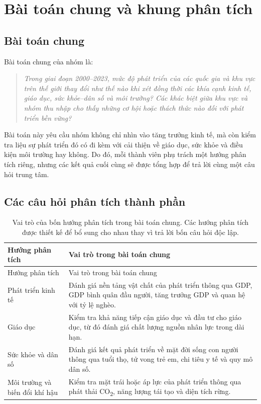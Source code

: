 \section{Bài toán chung và khung phân tích}

\subsection{Bài toán chung}

Bài toán chung của nhóm là:

\begin{quote}
\textit{Trong giai đoạn 2000--2023, mức độ phát triển của các quốc gia và khu vực trên thế giới thay đổi như thế nào khi xét đồng thời các khía cạnh kinh tế, giáo dục, sức khỏe--dân số và môi trường? Các khác biệt giữa khu vực và nhóm thu nhập cho thấy những cơ hội hoặc thách thức nào đối với phát triển bền vững?}
\end{quote}

Bài toán này yêu cầu nhóm không chỉ nhìn vào tăng trưởng kinh tế, mà còn kiểm tra liệu sự phát triển đó có đi kèm với cải thiện về giáo dục, sức khỏe và điều kiện môi trường hay không. Do đó, mỗi thành viên phụ trách một hướng phân tích riêng, nhưng các kết quả cuối cùng sẽ được tổng hợp để trả lời cùng một câu hỏi trung tâm.

\subsection{Các câu hỏi phân tích thành phần}

\begin{longtable}{L{4cm}L{10cm}}
\caption{Vai trò của bốn hướng phân tích trong bài toán chung. Các hướng phân tích được thiết kế để bổ sung cho nhau thay vì trả lời bốn câu hỏi độc lập.}
\label{tab:analysis-framework}\\
\toprule
Hướng phân tích & Vai trò trong bài toán chung \\
\midrule
\endfirsthead
\toprule
Hướng phân tích & Vai trò trong bài toán chung \\
\midrule
\endhead
Phát triển kinh tế & Đánh giá nền tảng vật chất của phát triển thông qua GDP, GDP bình quân đầu người, tăng trưởng GDP và quan hệ với tỷ lệ nghèo. \\
Giáo dục & Kiểm tra khả năng tiếp cận giáo dục và đầu tư cho giáo dục, từ đó đánh giá chất lượng nguồn nhân lực trong dài hạn. \\
Sức khỏe và dân số & Đánh giá kết quả phát triển về mặt đời sống con người thông qua tuổi thọ, tử vong trẻ em, chi tiêu y tế và quy mô dân số. \\
Môi trường và biến đổi khí hậu & Kiểm tra mặt trái hoặc áp lực của phát triển thông qua phát thải CO\textsubscript{2}, năng lượng tái tạo và diện tích rừng. \\
\bottomrule
\end{longtable}

